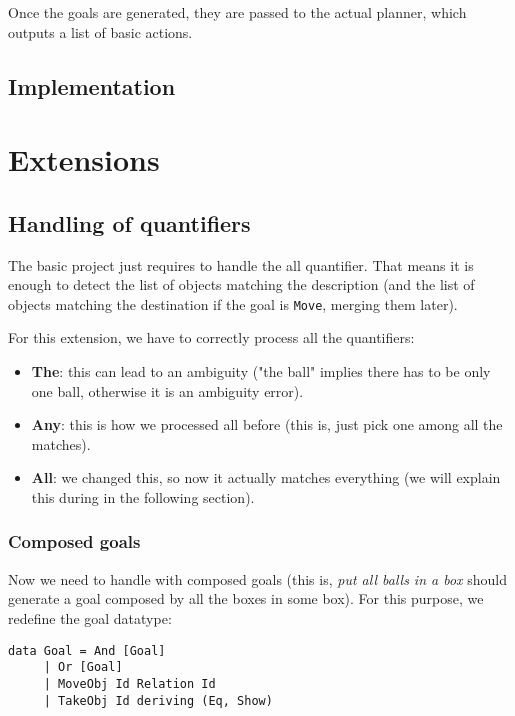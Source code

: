\documentclass[11pt]{article}
\begin{document}
	Once the goals are generated, they are passed to the actual planner, which 
	outputs a list of basic actions.

	\subsection{Implementation}


	\section{Extensions}

	\subsection{Handling of quantifiers}

          The basic project just requires to handle the all quantifier. That means it is enough to
          detect the list of objects matching the description (and the list of objects matching the destination if the goal is \texttt{Move}, merging them later).

          For this extension, we have to correctly process all the quantifiers:

          \begin{itemize}
            \item {\bf The}: this can lead to an ambiguity ("the ball" implies there has to be only one ball, otherwise it is an ambiguity error).
            \item {\bf Any}: this is how we processed all before (this is, just pick one among all the matches).
            \item {\bf All}: we changed this, so now it actually matches everything (we will explain this during in the following section).
          \end{itemize}

          \subsubsection{Composed goals}
          Now we need to handle with composed goals (this is, \textit{put all balls in a box} should
          generate a goal composed by all the boxes in some box). For this purpose, we redefine the goal datatype:

\begin{verbatim}
data Goal = And [Goal]
     | Or [Goal]
     | MoveObj Id Relation Id
     | TakeObj Id deriving (Eq, Show)
\end{verbatim}
\end{document}
